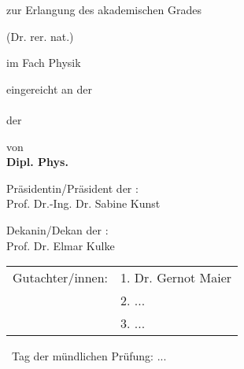 \makeatletter
\begin{titlepage}
\begin{spacing}{1}
  \setlength{\parindentbak}{\parindent}
  \setlength{\parskipbak}{\parskip}

\setlength{\parindent}{0pt}
\setlength{\parskip}{\baselineskip}

\thispagestyle{empty}

\expandafter \Large\sffamily \expandafter

\begin{center}
\begin{spacing}{1.2}
\begingroup
\fontsize{18pt}{10pt}\selectfont
{\textbf{\mytitle}}
\endgroup
\end{spacing}

\vfill


zur Erlangung des akademischen Grades


(Dr. rer. nat.)

im Fach Physik

eingereicht an der \\ \myfaculty \\ der \myuni 

von\\

\textbf{Dipl. Phys. \myname} \\

\vfill
\vfill

Pr\"asidentin/Pr\"asident der \myuni: \\
\vspace{0.2\baselineskip}
Prof. Dr.-Ing. Dr. Sabine Kunst  \\
\vspace{\baselineskip}

Dekanin/Dekan der \myfaculty: \\
\vspace{0.2\baselineskip}
Prof. Dr. Elmar Kulke  \\
\vspace{1.5\baselineskip}

\end{center}
\noindent
\begin{tabular}{ll}
Gutachter/innen: 
& 1. Dr. Gernot Maier \\
& 2. ... \\
& 3. ... \\
\end{tabular}

~Tag der m\"undlichen Pr\"ufung: ...

\setlength{\parindent}{\parindentbak}
\setlength{\parskip}{\parskipbak}
\end{spacing}
\end{titlepage}
\makeatother
